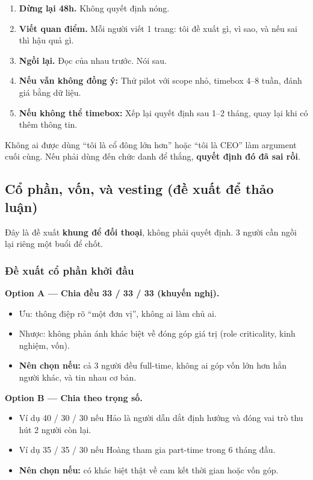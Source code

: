\documentclass[11pt,a4paper]{article}
\begin{document}
\begin{enumerate}
\item \textbf{Dừng lại 48h.} Không quyết định nóng.
\item \textbf{Viết quan điểm.} Mỗi người viết 1 trang: tôi đề xuất gì, vì sao, và nếu sai thì hậu quả gì.
\item \textbf{Ngồi lại.} Đọc của nhau trước. Nói sau.
\item \textbf{Nếu vẫn không đồng ý:} Thử pilot với scope nhỏ, timebox 4--8 tuần, đánh giá bằng dữ liệu.
\item \textbf{Nếu không thể timebox:} Xếp lại quyết định sau 1--2 tháng, quay lại khi có thêm thông tin.
\end{enumerate}

\begin{warnbox}[title=Luật không thành văn]
Không ai được dùng ``tôi là cổ đông lớn hơn'' hoặc ``tôi là CEO'' làm argument
cuối cùng. Nếu phải dùng đến chức danh để thắng, \textbf{quyết định đó đã sai rồi}.
\end{warnbox}

\subsection{Cổ phần, vốn, và vesting (đề xuất để thảo luận)}

Đây là đề xuất \textbf{khung để đối thoại}, không phải quyết định. 3 người cần
ngồi lại riêng một buổi để chốt.

\subsubsection*{Đề xuất cổ phần khởi đầu}

\textbf{Option A --- Chia đều 33 / 33 / 33 (khuyến nghị).}
\begin{itemize}
\item Ưu: thông điệp rõ ``một đơn vị'', không ai làm chủ ai.
\item Nhược: không phản ánh khác biệt về đóng góp giá trị (role criticality, kinh nghiệm, vốn).
\item \textbf{Nên chọn nếu:} cả 3 người đều full-time, không ai góp vốn lớn hơn hẳn người khác, và tin nhau cơ bản.
\end{itemize}

\textbf{Option B --- Chia theo trọng số.}
\begin{itemize}
\item Ví dụ 40 / 30 / 30 nếu Hảo là người dẫn dắt định hướng và đóng vai trò thu hút 2 người còn lại.
\item Ví dụ 35 / 35 / 30 nếu Hoàng tham gia part-time trong 6 tháng đầu.
\item \textbf{Nên chọn nếu:} có khác biệt thật về cam kết thời gian hoặc vốn góp.
\end{itemize}
\end{document}
